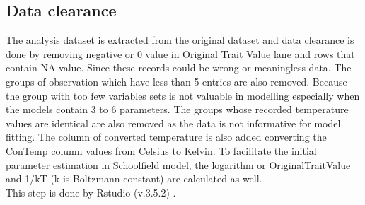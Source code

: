 \documentclass[12pt,a4paper]{article}
\begin{document}
\subsection{Data clearance}
The analysis dataset is extracted from the original dataset and data clearance is done by removing negative or 0 value in Original Trait Value lane and rows that contain NA value. Since these records could be wrong or meaningless data. The groups of observation which have less than 5 entries are also removed. Because the group with too few variables sets is not valuable in modelling especially when the models contain 3 to 6 parameters. The groups whose recorded temperature values are identical are also removed as the data is not informative for model fitting. The column of converted temperature is also added converting the ConTemp column values from Celsius to Kelvin. To facilitate the initial parameter estimation in Schoolfield model, the logarithm or OriginalTraitValue and 1/kT (k is Boltzmann constant) are calculated as well.
\\
This step is done by Rstudio (v.3.5.2) \cite{Rstudio}.
\end{document}

